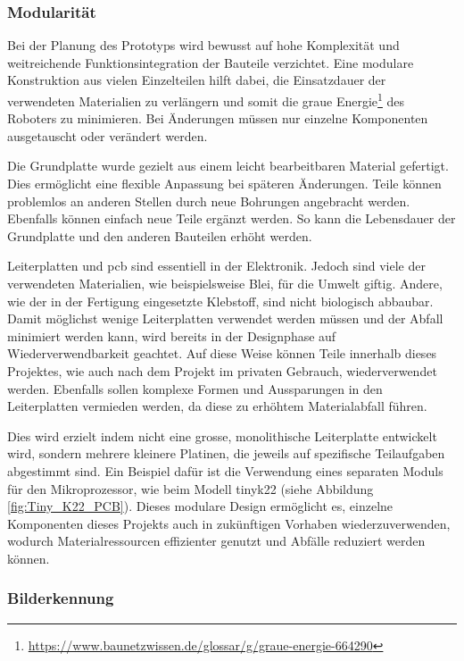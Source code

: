 \subsubsection{Modularität}\label{nachhaltigkeit:mod}

Bei der Planung des Prototyps wird bewusst auf hohe Komplexität und weitreichende Funktionsintegration der Bauteile verzichtet. Eine modulare Konstruktion aus vielen Einzelteilen hilft dabei, die Einsatzdauer der verwendeten Materialien zu verlängern und somit die graue Energie\footnote{\url{https://www.baunetzwissen.de/glossar/g/graue-energie-664290}} des Roboters zu minimieren. Bei Änderungen müssen nur einzelne Komponenten ausgetauscht oder verändert werden.

Die Grundplatte wurde gezielt aus einem leicht bearbeitbaren Material gefertigt. Dies ermöglicht eine flexible Anpassung bei späteren Änderungen. Teile können problemlos an anderen Stellen durch neue Bohrungen angebracht werden. Ebenfalls können einfach neue Teile ergänzt werden. So kann die Lebensdauer der Grundplatte und den anderen Bauteilen erhöht werden.

Leiterplatten und \acrfull{pcb} sind essentiell in der Elektronik. Jedoch sind viele der verwendeten Materialien, wie beispielsweise Blei, für die Umwelt giftig. Andere, wie der in der Fertigung eingesetzte Klebstoff, sind nicht biologisch abbaubar. Damit möglichst wenige Leiterplatten verwendet werden müssen und der Abfall minimiert werden kann, wird bereits in der Designphase auf Wiederverwendbarkeit geachtet. Auf diese Weise können Teile innerhalb dieses Projektes, wie auch nach dem Projekt im privaten Gebrauch, wiederverwendet werden. Ebenfalls sollen komplexe Formen und Aussparungen in den Leiterplatten vermieden werden, da diese zu erhöhtem Materialabfall führen.

Dies wird erzielt indem nicht eine grosse, monolithische Leiterplatte entwickelt wird, sondern mehrere kleinere Platinen, die jeweils auf spezifische Teilaufgaben abgestimmt sind. Ein Beispiel dafür ist die Verwendung eines separaten Moduls für den Mikroprozessor, wie beim Modell \gls{tinyk22} (siehe Abbildung \ref{fig:Tiny_K22_PCB}). Dieses modulare Design ermöglicht es, einzelne Komponenten dieses Projekts auch in zukünftigen Vorhaben wiederzuverwenden, wodurch Materialressourcen effizienter genutzt und Abfälle reduziert werden können.


\subsubsection{Bilderkennung}\label{nachhaltigkeit:bilderkennung}

